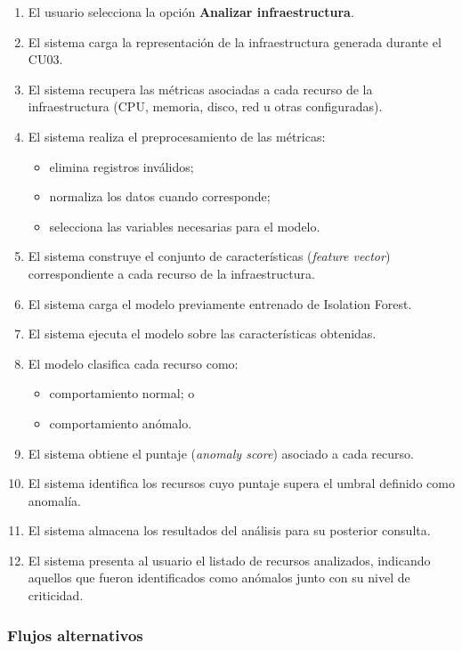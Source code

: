 \begin{enumerate}
\item El usuario selecciona la opción \textbf{Analizar infraestructura}.
\item El sistema carga la representación de la infraestructura generada durante el CU03.
\item El sistema recupera las métricas asociadas a cada recurso de la infraestructura (CPU, memoria, disco, red u otras configuradas).
\item El sistema realiza el preprocesamiento de las métricas:
  \begin{itemize}
  \item elimina registros inválidos;
  \item normaliza los datos cuando corresponde;
  \item selecciona las variables necesarias para el modelo.
  \end{itemize}
\item El sistema construye el conjunto de características (\emph{feature vector}) correspondiente a cada recurso de la infraestructura.
\item El sistema carga el modelo previamente entrenado de Isolation Forest.
\item El sistema ejecuta el modelo sobre las características obtenidas.
\item El modelo clasifica cada recurso como:
  \begin{itemize}
  \item comportamiento normal; o
  \item comportamiento anómalo.
  \end{itemize}
\item El sistema obtiene el puntaje (\emph{anomaly score}) asociado a cada recurso.
\item El sistema identifica los recursos cuyo puntaje supera el umbral definido como anomalía.
\item El sistema almacena los resultados del análisis para su posterior consulta.
\item El sistema presenta al usuario el listado de recursos analizados, indicando aquellos que fueron identificados como anómalos junto con su nivel de criticidad.
\end{enumerate}

\subsubsection*{Flujos alternativos}

